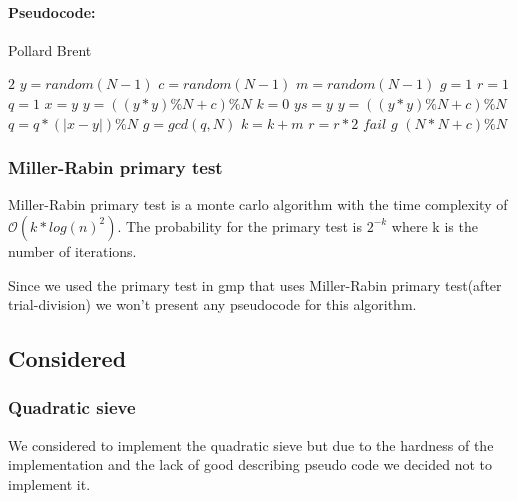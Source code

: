 \paragraph{Pseudocode:}

\textcolor{white}{ }

\begin{algorithm}[H]
\caption{Pollard Brent}
\begin{algorithmic}
	 	\State \Return $2$
	\EndIf
	\State $y = random(N-1)$
	\State $c = random(N-1)$
	\State $m = random(N-1)$
	\State $g = 1$
	\State $r = 1$
	\State $q = 1$
		\State $x = y$
			\State $y = ((y*y)\%N+c)\%N$
		\EndFor
		\State $k = 0$
			\State $ys = y$
				\State $y = ((y*y)\%N+c)\%N$
				\State $q = q * (|x-y|)\%N$
			\EndFor
			\State $g = gcd(q,N)$
			\State $k = k + m$
		\EndWhile
		\State $r = r * 2$ 
	\EndWhile
		\State \Return $fail$
	\EndIf
	\State \Return $g$	
\EndFunction
{}
	\State \Return $(N*N + c) \% N$
\EndFunction
\end{algorithmic}
\end{algorithm}

\subsubsection{Miller-Rabin primary test}

Miller-Rabin primary test is a monte carlo algorithm with the time complexity of $\mathcal{O}(k*log(n)^2)$. The
probability for the primary test is $2^{-k}$ where k is the number of iterations.

Since we used the primary test in gmp that uses Miller-Rabin primary test(after trial-division) we won’t present any pseudocode for this algorithm. 


\subsection{Considered}

\subsubsection{Quadratic sieve}

We considered to implement the quadratic sieve but due to the hardness of the implementation and the lack of good describing pseudo code we decided not to implement it.

